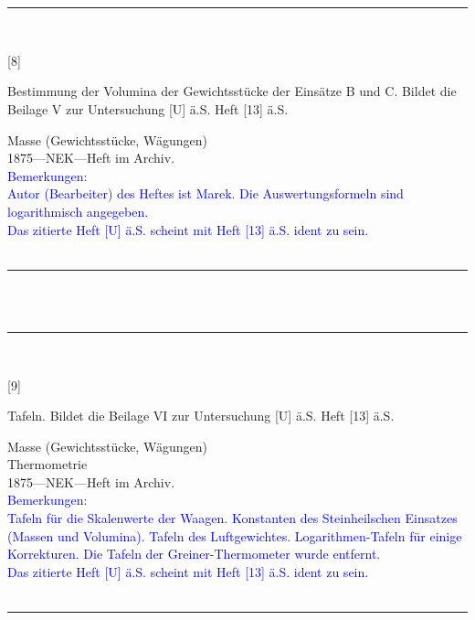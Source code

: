 \\
\vspace*{-2.5pt}\\
\parbox{\textwidth}{%
\rule{\textwidth}{1pt}\vspace*{-3mm}\\
\begin{minipage}[t]{0.1\textwidth}\vspace{0pt}
\Huge\rule[-4mm]{0cm}{1cm}[8]
\end{minipage}
\hfill
\begin{minipage}[t]{0.9\textwidth}\vspace{0pt}
\large Bestimmung der Volumina der Gewichtsstücke der Einsätze B und C. Bildet die Beilage V zur Untersuchung [U] ä.S. Heft [13] ä.S.\rule[-2mm]{0mm}{2mm}
\end{minipage}
{\footnotesize\flushright
Masse (Gewichtsstücke, Wägungen)\\
}
1875\quad---\quad NEK\quad---\quad Heft im Archiv.\\
\textcolor{blue}{Bemerkungen:\\{}
Autor (Bearbeiter) des Heftes ist Marek. Die Auswertungsformeln sind logarithmisch angegeben.\\{}
Das zitierte Heft [U] ä.S. scheint mit Heft [13] ä.S. ident zu sein.\\{}
}
\\[-15pt]
\rule{\textwidth}{1pt}
}
\\
\vspace*{-2.5pt}\\
\parbox{\textwidth}{%
\rule{\textwidth}{1pt}\vspace*{-3mm}\\
\begin{minipage}[t]{0.1\textwidth}\vspace{0pt}
\Huge\rule[-4mm]{0cm}{1cm}[9]
\end{minipage}
\hfill
\begin{minipage}[t]{0.9\textwidth}\vspace{0pt}
\large Tafeln. Bildet die Beilage VI zur Untersuchung [U] ä.S. Heft [13] ä.S.\rule[-2mm]{0mm}{2mm}
\end{minipage}
{\footnotesize\flushright
Masse (Gewichtsstücke, Wägungen)\\
Thermometrie\\
}
1875\quad---\quad NEK\quad---\quad Heft im Archiv.\\
\textcolor{blue}{Bemerkungen:\\{}
Tafeln für die Skalenwerte der Waagen. Konstanten des Steinheilschen Einsatzes (Massen und Volumina). Tafeln des Luftgewichtes. Logarithmen-Tafeln für einige Korrekturen. Die Tafeln der Greiner-Thermometer wurde entfernt.\\{}
Das zitierte Heft [U] ä.S. scheint mit Heft [13] ä.S. ident zu sein.\\{}
}
\\[-15pt]
\rule{\textwidth}{1pt}
}
